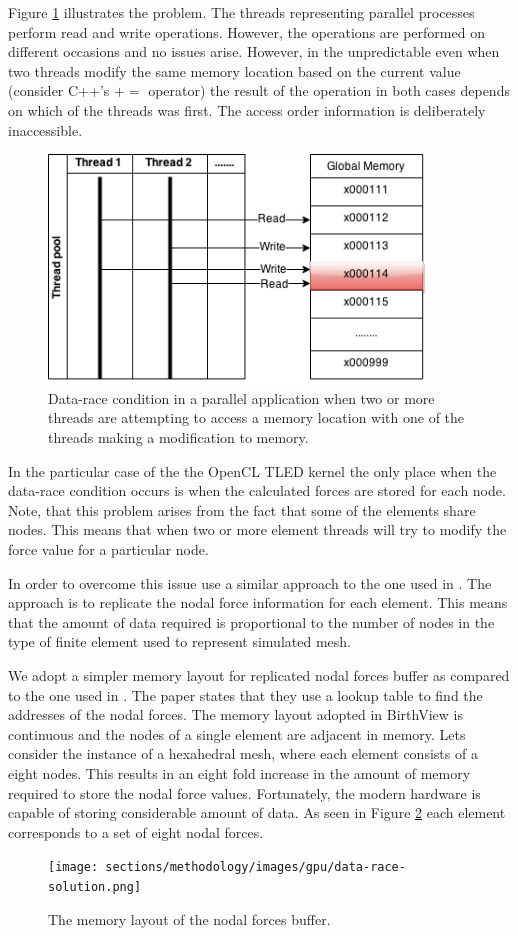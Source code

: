   Figure \ref{gpu-data-race} illustrates the problem. The threads representing parallel processes perform read and write operations. However, the operations are performed on different occasions and no issues arise. However, in the unpredictable even when two threads modify the same memory location based on the current value (consider C++'s $+=$ operator) the result of the operation in both cases depends on which of the threads was first. The access order information is deliberately inaccessible.

  \begin{figure}
    \centering
      \includegraphics[width=100mm]{sections/methodology/images/gpu/data-race.png}
    \caption{\label{gpu-data-race} Data-race condition in a parallel application when two or more threads are attempting to access a memory location with one of the threads making a modification to memory.}
  \end{figure}

  In the particular case of the the OpenCL TLED kernel the only place when the data-race condition occurs is when the calculated forces are stored for each node. Note, that this problem arises from the fact that some of the elements share nodes. This means that when two or more element threads will try to modify the force value for a particular node.

  In order to overcome this issue use a similar approach to the one used in \cite{Johnsen2014}. The approach is to replicate the nodal force information for each element. This means that the amount of data required is proportional to the number of nodes in the type of finite element used to represent simulated mesh.

  We adopt a simpler memory layout for replicated nodal forces buffer as compared to the one used in \cite{Johnsen2014}. The paper states that they use a lookup table to find the addresses of the nodal forces. The memory layout adopted in BirthView is continuous and the nodes of a single element are adjacent in memory. Lets consider the instance of a hexahedral mesh, where each element consists of a eight nodes. This results in an eight fold increase in the amount of memory required to store the nodal force values. Fortunately, the modern hardware is capable of storing considerable amount of data. As seen in Figure \ref{gpu-data-race-solution} each element corresponds to a set of eight nodal forces.

  \begin{figure}
    \centering
      \texttt{[image: sections/methodology/images/gpu/data-race-solution.png]}
    \caption{\label{gpu-data-race-solution} The memory layout of the nodal forces buffer.}
  \end{figure}
